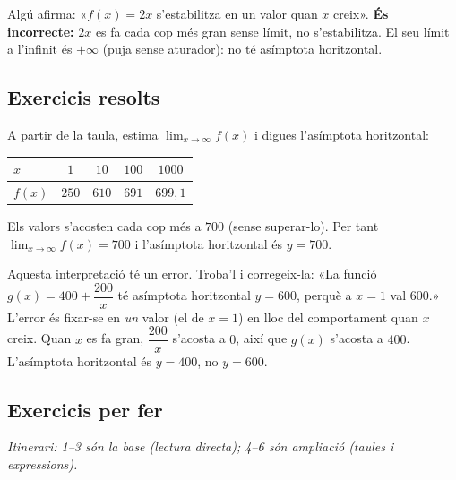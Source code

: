 \begin{exemple}
Algú afirma: «$f(x)=2x$ s'estabilitza en un valor quan $x$ creix». \textbf{És
incorrecte:} $2x$ es fa cada cop més gran sense límit, no s'estabilitza. El seu límit
a l'infinit és $+\infty$ (puja sense aturador): no té asímptota horitzontal.
\end{exemple}

\subsection{Exercicis resolts}

\begin{exresolt}
A partir de la taula, estima $\lim_{x\to\infty}f(x)$ i digues l'asímptota horitzontal:
\begin{center}
\begin{tabular}{lcccc}
\toprule
$x$ & $1$ & $10$ & $100$ & $\num{1000}$ \\
\midrule
$f(x)$ & $250$ & $610$ & $691$ & $699,1$ \\
\bottomrule
\end{tabular}
\end{center}
\solucio
Els valors s'acosten cada cop més a $700$ (sense superar-lo). Per tant
$\lim_{x\to\infty}f(x)=700$ i l'asímptota horitzontal és $y=700$.
\end{exresolt}

\begin{exresolt}
Aquesta interpretació té un error. Troba'l i corregeix-la: «La funció
$g(x)=400+\dfrac{200}{x}$ té asímptota horitzontal $y=600$, perquè a $x=1$ val
$600$.»
\solucio
L'error és fixar-se en \emph{un} valor (el de $x=1$) en lloc del comportament quan $x$
creix. Quan $x$ es fa gran, $\dfrac{200}{x}$ s'acosta a $0$, així que $g(x)$ s'acosta a
\textbf{$400$}. L'asímptota horitzontal és $y=400$, no $y=600$.
\end{exresolt}

\subsection{Exercicis per fer}

\noindent\textit{Itinerari: 1–3 són la base (lectura directa); 4–6 són ampliació
(taules i expressions).}

